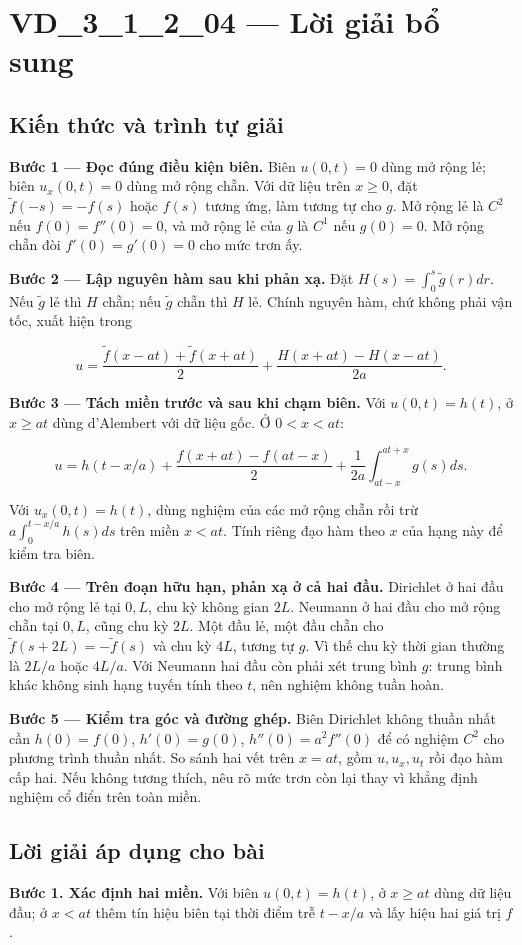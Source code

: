\documentclass[10pt,a4paper]{article}
\begin{document}
\section*{VD\_3\_1\_2\_04 — Lời giải bổ sung}
\subsection*{Kiến thức và trình tự giải}
\textbf{Bước 1 — Đọc đúng điều kiện biên.} Biên $u(0,t)=0$ dùng mở rộng lẻ; biên $u_x(0,t)=0$ dùng mở rộng chẵn. Với dữ liệu trên $x\ge0$, đặt $\widetilde f(-s)=-f(s)$ hoặc $f(s)$ tương ứng, làm tương tự cho $g$. Mở rộng lẻ là $C^2$ nếu $f(0)=f''(0)=0$, và mở rộng lẻ của $g$ là $C^1$ nếu $g(0)=0$. Mở rộng chẵn đòi $f'(0)=g'(0)=0$ cho mức trơn ấy.

\textbf{Bước 2 — Lập nguyên hàm sau khi phản xạ.} Đặt $H(s)=\int_0^s\widetilde g(r)dr$. Nếu $\widetilde g$ lẻ thì $H$ chẵn; nếu $\widetilde g$ chẵn thì $H$ lẻ. Chính nguyên hàm, chứ không phải vận tốc, xuất hiện trong


\[
u=\frac{\widetilde f(x-at)+\widetilde f(x+at)}2+\frac{H(x+at)-H(x-at)}{2a}.
\]


\textbf{Bước 3 — Tách miền trước và sau khi chạm biên.} Với $u(0,t)=h(t)$, ở $x\ge at$ dùng d'Alembert với dữ liệu gốc. Ở $0<x<at$:


\[
u=h(t-x/a)+\frac{f(x+at)-f(at-x)}2+\frac1{2a}\int_{at-x}^{at+x}g(s)ds.
\]


Với $u_x(0,t)=h(t)$, dùng nghiệm của các mở rộng chẵn rồi trừ $a\int_0^{t-x/a}h(s)ds$ trên miền $x<at$. Tính riêng đạo hàm theo $x$ của hạng này để kiểm tra biên.

\textbf{Bước 4 — Trên đoạn hữu hạn, phản xạ ở cả hai đầu.} Dirichlet ở hai đầu cho mở rộng lẻ tại $0,L$, chu kỳ không gian $2L$. Neumann ở hai đầu cho mở rộng chẵn tại $0,L$, cũng chu kỳ $2L$. Một đầu lẻ, một đầu chẵn cho $\widetilde f(s+2L)=-\widetilde f(s)$ và chu kỳ $4L$, tương tự $g$. Vì thế chu kỳ thời gian thường là $2L/a$ hoặc $4L/a$. Với Neumann hai đầu còn phải xét trung bình $g$: trung bình khác không sinh hạng tuyến tính theo $t$, nên nghiệm không tuần hoàn.

\textbf{Bước 5 — Kiểm tra góc và đường ghép.} Biên Dirichlet không thuần nhất cần $h(0)=f(0)$, $h'(0)=g(0)$, $h''(0)=a^2f''(0)$ để có nghiệm $C^2$ cho phương trình thuần nhất. So sánh hai vết trên $x=at$, gồm $u,u_x,u_t$ rồi đạo hàm cấp hai. Nếu không tương thích, nêu rõ mức trơn còn lại thay vì khẳng định nghiệm cổ điển trên toàn miền.
\subsection*{Lời giải áp dụng cho bài}
\textbf{Bước 1. Xác định hai miền.} Với biên $u(0,t)=h(t)$, ở $x\ge at$ dùng dữ liệu đầu; ở $x<at$ thêm tín hiệu biên tại thời điểm trễ $t-x/a$ và lấy hiệu hai giá trị $f$.
\end{document}
